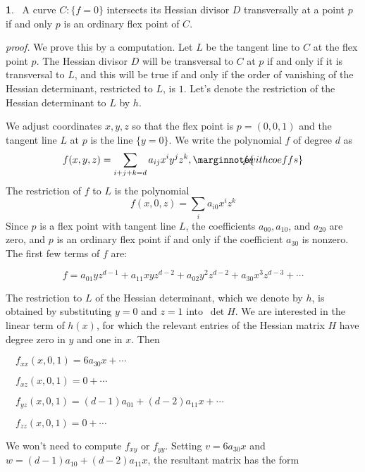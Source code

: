 \documentclass[leqno]{book}
\newcommand\Marginnote[1]{\marginnote{\hspace{-12pt}\normalfont{#1}}}
\theoremstyle{definition}%
\numberwithin{equation}{section}
\theoremstyle{theorem} %
\newtheorem{lemma}[equation]{}
\renewenvironment{proof}{\no \emph{proof.}}{}
\begin{document}
\begin{lemma}{}\Marginnote{transversalH}\;\,
A curve $C: \{f=0\}$ intersects its Hessian divisor $D$ transversally
at a point $p$ if and only $p$ is an ordinary flex point of $C$.
\label{transversalH} \end{lemma}


 \begin{proof} 
We prove this by a computation.  Let $L$ be the tangent line to $C$ at
the flex point $p$.  The Hessian divisor $D$ will be transversal to
$C$ at $p$ if and only if it is transversal to $L$, and this will be
true if and only if the order of vanishing of the Hessian determinant,
restricted to $L$, is $1$.  Let's denote the restriction of the
Hessian determinant to $L$ by $h$.

We adjust coordinates $x,y,z$ so that the flex point is 
$p=(0,0,1)$ and the tangent line $L$ at $p$ is the line $\{y=0\}$.
We write the polynomial $f$ of degree $d$ as 
\begin{equation}
f(x,y,z) = \sum_{i+j+k=d}a_{ij}x^iy^jz^k ,\Marginnote{fwithcoeffs}
\label{fwithcoeffs}
\end{equation}
The restriction of $f$ to $L$ is the polynomial 
$$f(x,0,z) = \sum_i a_{i0}x^iz^k$$ Since $p$ is a flex point with
tangent line $L$, the coefficients $a_{00}, a_{10}$, and $a_{20}$ are
zero, and $p$ is an ordinary flex point if and only if the coefficient
$a_{30}$ is nonzero.  The first few terms of $f$ are:

$$f = a_{01}yz^{d-1}+a_{11}xyz^{d-2} + a_{02}y^2z^{d-2} + a_{30}x^3z^{d-3} + \cdots$$

The restriction to $L$ of the Hessian determinant, which we denote by
$h$, is obtained by substituting $y=0$ and $z=1$ into $\,\det H$.  We
are interested in the linear term of $h(x)$, for which the relevant
entries of the Hessian matrix $H$ have degree zero in $y$ and one in
$x$.  Then

\ms $\quad f_{xx}{(x,0,1)} =  6 a_{30} x +\cdots$

$\quad f_{xz}{(x,0,1)} =  0 +\cdots$

$\quad f_{yz}{(x,0,1)} = (d\!-\!1)a_{01}+(d\!-\!2)a_{11}x +\cdots$


$\quad f_{zz}{(x,0,1)} =  0 + \cdots$

\msno We won't need to compute $f_{xy}$ or $f_{yy}$.  Setting
$v=6a_{30}x$ and $w = (d\!-\!1)a_{10} + (d\!-\!2)a_{11}x$, the
resultant matrix has the form



\end{proof}
\end{document}
